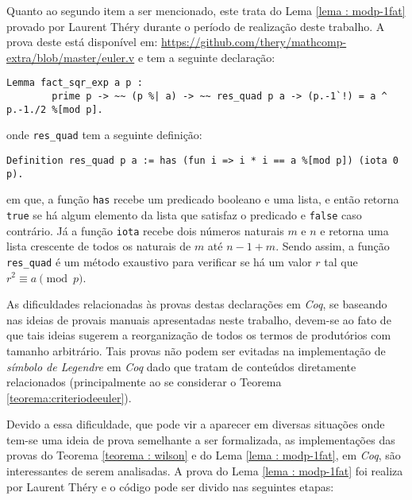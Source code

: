 Quanto ao segundo item a ser mencionado, este trata do Lema \ref{lema : modp-1fat} provado por Laurent Théry durante o período de realização deste trabalho. A prova deste está disponível em: \url{https://github.com/thery/mathcomp-extra/blob/master/euler.v} e tem a seguinte declaração:
        \begin{lstlisting}[language=coq,frame=single,tabsize=1]
Lemma fact_sqr_exp a p :
        prime p -> ~~ (p %| a) -> ~~ res_quad p a -> (p.-1`!) = a ^ p.-1./2 %[mod p].
        \end{lstlisting}
onde \lstinline[language=coq]!res_quad! tem a seguinte definição:
        \begin{lstlisting}[language=coq,frame=single,tabsize=1]
Definition res_quad p a := has (fun i => i * i == a %[mod p]) (iota 0 p).
        \end{lstlisting}
em que, a função \lstinline[language=coq]!has! recebe um predicado booleano e uma lista, e então retorna \lstinline[language=coq]!true!
se há algum elemento da lista que satisfaz o predicado e \lstinline[language=coq]!false! caso contrário. Já a função \lstinline[language=coq]!iota! recebe dois números naturais $m$ e $n$ e retorna uma lista crescente de todos os naturais de $m$ até $n-1+m$. Sendo assim, a função \lstinline[language=coq]!res_quad! é um método exaustivo para verificar se há um valor $r$ tal que $r^{2} \equiv a \pmod{p}$.

As dificuldades relacionadas às provas destas declarações em \textit{Coq}, se baseando nas ideias de provais manuais apresentadas neste trabalho, devem-se ao fato de que tais ideias sugerem a reorganização de todos os termos de produtórios com tamanho arbitrário. Tais provas não podem ser evitadas na implementação de \textit{símbolo de Legendre} em \textit{Coq} dado que tratam de conteúdos diretamente relacionados (principalmente ao se considerar o Teorema \ref{teorema:criteriodeeuler}).

Devido a essa dificuldade, que pode vir a aparecer em diversas situações onde tem-se uma ideia de prova semelhante a ser formalizada, as implementações das provas do Teorema \ref{teorema : wilson} e do Lema \ref{lema : modp-1fat}, em \textit{Coq}, são interessantes de serem analisadas. A prova do Lema \ref{lema : modp-1fat} foi realiza por Laurent Théry e o código pode ser divido nas seguintes etapas:



